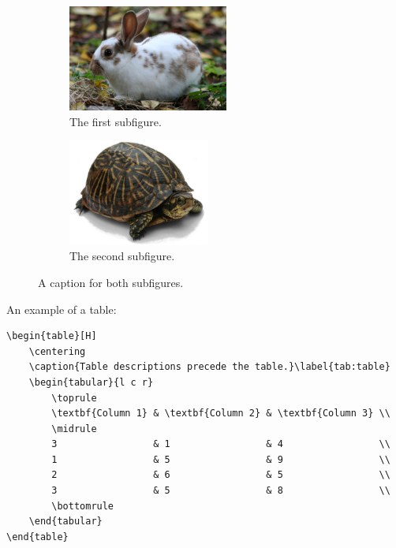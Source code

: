 \documentclass[11pt, twoside]{article}
\begin{document}
\begin{outputbox}
    \begin{figure}[H]
        \centering
        \begin{subfigure}{0.47\linewidth}
            \centering
            \includegraphics[height=3.5cm]{images/rabbit.jpg}
            \caption{The first subfigure.}
        \end{subfigure}
        \begin{subfigure}{0.47\linewidth}
            \centering
            \includegraphics[height=3.5cm]{images/turtle.jpg}
            \caption{The second subfigure.}\label{fig:turtle}
        \end{subfigure}
        \caption{A caption for both subfigures.}
    \end{figure}
\end{outputbox}
\pagebreak
An example of a table:
\begin{lstlisting}
\begin{table}[H]
    \centering
    \caption{Table descriptions precede the table.}\label{tab:table}
    \begin{tabular}{l c r}
        \toprule
        \textbf{Column 1} & \textbf{Column 2} & \textbf{Column 3} \\
        \midrule
        3                 & 1                 & 4                 \\
        1                 & 5                 & 9                 \\
        2                 & 6                 & 5                 \\
        3                 & 5                 & 8                 \\
        \bottomrule
    \end{tabular}
\end{table}
\end{lstlisting}
\end{document}
